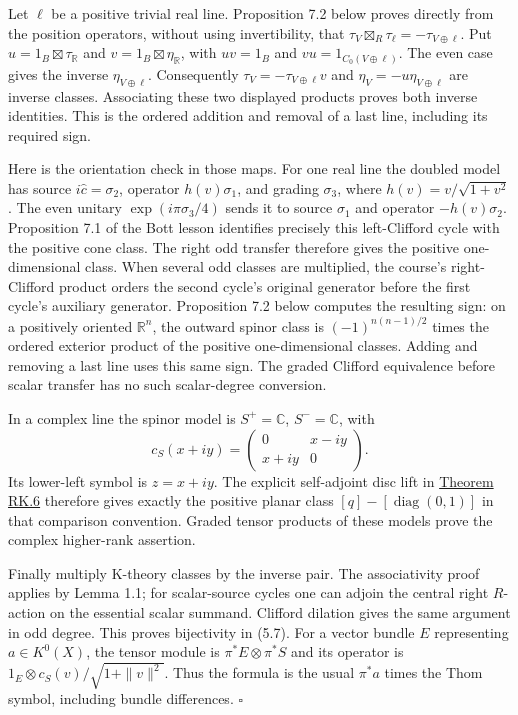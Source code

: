\documentclass[
  11pt,
]{article}
\begin{document}
Let \(\ell\) be a positive trivial real line. Proposition 7.2 below
proves directly from the position operators, without using
invertibility, that \(\tau_V\boxtimes_R\tau_\ell=-\tau_{V\oplus\ell}\).
Put \(u=1_B\boxtimes\tau_{\mathbb R}\) and
\(v=1_B\boxtimes\eta_{\mathbb R}\), with \(uv=1_B\) and
\(vu=1_{C_0(V\oplus\ell)}\). The even case gives the inverse
\(\eta_{V\oplus\ell}\). Consequently \(\tau_V=-\tau_{V\oplus\ell}v\) and
\(\eta_V=-u\eta_{V\oplus\ell}\) are inverse classes. Associating these
two displayed products proves both inverse identities. This is the
ordered addition and removal of a last line, including its required
sign.

Here is the orientation check in those maps. For one real line the
doubled model has source \(i\widehat c=\sigma_2\), operator
\(h(v)\sigma_1\), and grading \(\sigma_3\), where
\(h(v)=v/\sqrt{1+v^2}\). The even unitary \(\exp(i\pi\sigma_3/4)\) sends
it to source \(\sigma_1\) and operator \(-h(v)\sigma_2\). Proposition
7.1 of the Bott lesson identifies precisely this left-Clifford cycle
with the positive cone class. The right odd transfer therefore gives the
positive one-dimensional class. When several odd classes are multiplied,
the course's right-Clifford product orders the second cycle's original
generator before the first cycle's auxiliary generator. Proposition 7.2
below computes the resulting sign: on a positively oriented
\(\mathbb R^n\), the outward spinor class is \((-1)^{n(n-1)/2}\) times
the ordered exterior product of the positive one-dimensional classes.
Adding and removing a last line uses this same sign. The graded Clifford
equivalence before scalar transfer has no such scalar-degree conversion.

In a complex line the spinor model is \(S^+=\mathbb C\),
\(S^-=\mathbb C\), with \[
c_S(x+iy)=
\begin{pmatrix}0&x-iy\\x+iy&0\end{pmatrix}.
\tag{5.9}
\] Its lower-left symbol is \(z=x+iy\). The explicit self-adjoint disc
lift in
\href{supporting/relative-k-foundations/relative-k-foundations.html\#rk-planar-bott}{Theorem
RK.6} therefore gives exactly the positive planar class
\([q]-[\operatorname{diag}(0,1)]\) in that comparison convention. Graded
tensor products of these models prove the complex higher-rank assertion.

Finally multiply K-theory classes by the inverse pair. The associativity
proof applies by Lemma 1.1; for scalar-source cycles one can adjoin the
central right \(R\)-action on the essential scalar summand. Clifford
dilation gives the same argument in odd degree. This proves bijectivity
in (5.7). For a vector bundle \(E\) representing \(a\in K^0(X)\), the
tensor module is \(\pi^*E\otimes\pi^*S\) and its operator is
\(1_E\otimes c_S(v)/\sqrt{1+\|v\|^2}\). Thus the formula is the usual
\(\pi^*a\) times the Thom symbol, including bundle differences.
\(\square\)
\end{document}
